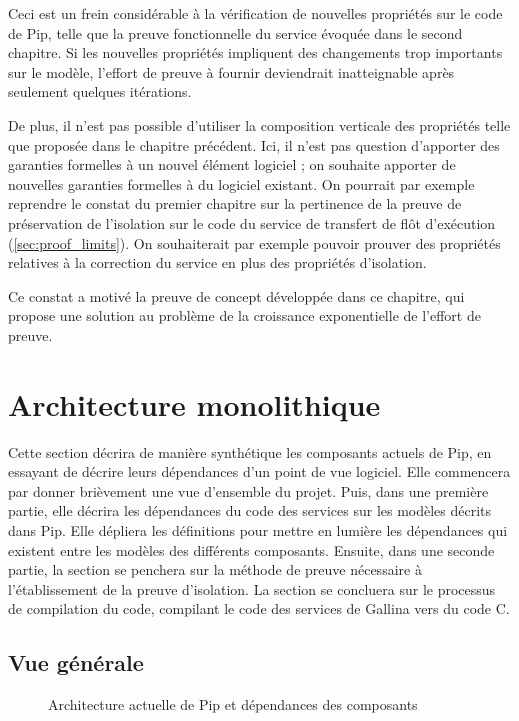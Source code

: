 	Ceci est un frein considérable à la vérification de nouvelles propriétés sur le code de Pip, telle que la preuve fonctionnelle du service évoquée dans le second chapitre. Si les nouvelles propriétés impliquent des changements trop importants sur le modèle, l'effort de preuve à fournir deviendrait inatteignable après seulement quelques itérations.

De plus, il n'est pas possible d'utiliser la composition verticale des propriétés telle que proposée dans le chapitre précédent. Ici, il n'est pas question d'apporter des garanties formelles à un nouvel élément logiciel ; on souhaite apporter de nouvelles garanties formelles à du logiciel existant. On pourrait par exemple reprendre le constat du premier chapitre sur la pertinence de la preuve de préservation de l'isolation sur le code du service de transfert de flôt d'exécution (\ref{sec:proof_limits}). On souhaiterait par exemple pouvoir prouver des propriétés relatives à la correction du service en plus des propriétés d'isolation.

	Ce constat a motivé la preuve de concept développée dans ce chapitre, qui propose une solution au problème de la croissance exponentielle de l'effort de preuve.

	\section{Architecture monolithique}

		Cette section décrira de manière synthétique les composants actuels de Pip, en essayant de décrire leurs dépendances d'un point de vue logiciel. Elle commencera par donner brièvement une vue d'ensemble du projet. Puis, dans une première partie, elle décrira les dépendances du code des services sur les modèles décrits dans Pip. Elle dépliera les définitions pour mettre en lumière les dépendances qui existent entre les modèles des différents composants. Ensuite, dans une seconde partie, la section se penchera sur la méthode de preuve nécessaire à l'établissement de la preuve d'isolation. La section se concluera sur le processus de compilation du code, compilant le code des services de Gallina vers du code C.
		
		\subsection{Vue générale}

			\begin{figure}[!ht]
				
				\caption{Architecture actuelle de Pip et dépendances des composants}
				\label{fig:currentPipArchitecture}
			\end{figure}

